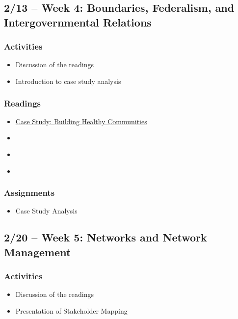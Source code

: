 \documentclass[12pt, letterpaper]{article}
\begin{document}
\subsection*{2/13 -- Week 4: Boundaries, Federalism, and Intergovernmental Relations}
    \subsubsection*{Activities}
        \begin{itemize}
            \item Discussion of the readings
            \item Introduction to case study analysis
        \end{itemize}
    \subsubsection*{Readings}
        \begin{itemize}
           \item \href{https://www.maxwell.syr.edu/docs/default-source/research/parcc/e-parcc/building-a-healthy-community-victoria-lowerson-and-martha-s-feldman-case.pdf?sfvrsn=c38fa74_2}{Case Study: Building Healthy Communities}
            \item \citet[chapter 2]{Agranoff2012}
            \item \citet[chapter 3]{Agranoff2023}
            \item \citet{Schneider2009}
        \end{itemize}
    \subsubsection*{Assignments}
        \begin{itemize}
            \item Case Study Analysis
        \end{itemize}         

\subsection*{2/20 -- Week 5: Networks and Network Management}
    \subsubsection*{Activities}
        \begin{itemize}
            \item Discussion of the readings
            \item Presentation of Stakeholder Mapping
        \end{itemize}
\end{document}

